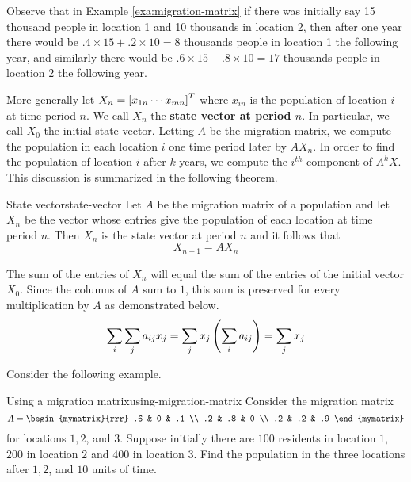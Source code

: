 Observe that in Example \ref{exa:migration-matrix} if there was initially say 15
thousand people in location 1 and 10 thousands in location 2, then
after one year there would be $.4 \times 15 + .2 \times 10 = 8$
thousands people in location 1 the following year, and similarly 
there would be $.6 \times 15 + .8 \times 10 = 17$
thousands people in location 2 the following year.

More generally let $X_n=\left[x_{1n} \cdots x_{mn}\right] ^{T}$ where $x_{in}$ is the
population of location $i$ at time period $n$. We call $X_n$ the \textbf{state vector at period $n$}. In particular, we call $X_0$ the initial state vector. Letting $A$ be the migration matrix, we compute the population in each location $i$ one time period later by $AX_n$. In order to find the population of location $i$ after $k$
years, we compute the $i^{th}$ component of $A^{k}X$. This discussion is summarized in the following theorem. 

\begin{theorem}{State vector}{state-vector}
Let $A$ be the migration matrix of a population and let $X_n$ be the vector whose entries give the population of each location at time period $n$. Then $X_n$ is the state vector at period $n$ and it follows that 
\[
X_{n+1} = A X_n
\]
\end{theorem}

The sum of the entries of $X_n$ will equal the sum of the entries of the initial
vector $X_{0}$. Since the columns of $A$ sum to $1$, this sum is preserved for every
multiplication by $A$ as demonstrated below. 
\begin{equation*}
\sum_{i}\sum_{j}a_{ij}x_{j}=\sum_{j}x_{j}\left(\sum_{i}a_{ij}\right)
=\sum_{j}x_{j}
\end{equation*}

Consider the following example.

\begin{example}{Using a migration matrix}{using-migration-matrix}
Consider the migration matrix 
\begin{equation*}
A = 
\begin{mymatrix}{rrr}
.6 & 0 & .1 \\
.2 & .8 & 0 \\
.2 & .2 & .9
\end{mymatrix} 
\end{equation*}
 for locations $1,2$, and $3$. Suppose initially there are $100$
residents in location $1$, $200$ in location $2$ and $400$ in location $3$. Find the
population in the three locations after $1,2$, and $10$ units of time.
\end{example}

